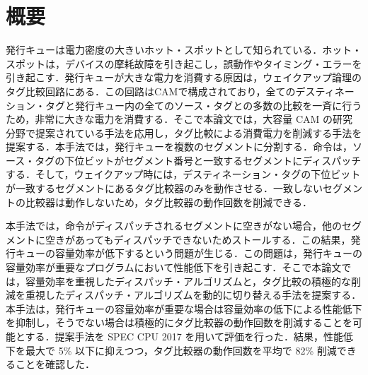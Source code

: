 
\chapter*{概要}
発行キューは電力密度の大きいホット・スポットとして知られている．ホット・スポットは，デバイスの摩耗故障を引き起こし，誤動作やタイミング・エラーを引き起こす．発行キューが大きな電力を消費する原因は，ウェイクアップ論理のタグ比較回路にある．この回路はCAMで構成されており，全てのデスティネーション・タグと発行キュー内の全てのソース・タグとの多数の比較を一斉に行うため，非常に大きな電力を消費する．そこで本論文では，大容量 CAM の研究分野で提案されている手法を応用し，タグ比較による消費電力を削減する手法を提案する．本手法では，発行キューを複数のセグメントに分割する．命令は，ソース・タグの下位ビットがセグメント番号と一致するセグメントにディスパッチする．そして，ウェイクアップ時には，デスティネーション・タグの下位ビットが一致するセグメントにあるタグ比較器のみを動作させる．一致しないセグメントの比較器は動作しないため，タグ比較器の動作回数を削減できる．

本手法では，命令がディスパッチされるセグメントに空きがない場合，他のセグメントに空きがあってもディスパッチできないためストールする．この結果，発行キューの容量効率が低下するという問題が生じる．この問題は，発行キューの容量効率が重要なプログラムにおいて性能低下を引き起こす．そこで本論文では，容量効率を重視したディスパッチ・アルゴリズムと，タグ比較の積極的な削減を重視したディスパッチ・アルゴリズムを動的に切り替える手法を提案する．本手法は，発行キューの容量効率が重要な場合は容量効率の低下による性能低下を抑制し，そうでない場合は積極的にタグ比較器の動作回数を削減することを可能とする．提案手法を SPEC CPU 2017 を用いて評価を行った．結果，性能低下を最大で 5\% 以下に抑えつつ，タグ比較器の動作回数を平均で 82\% 削減できることを確認した．
